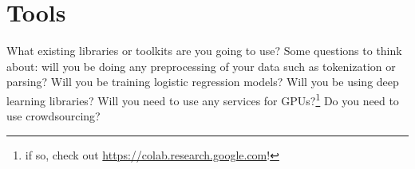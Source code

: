 \documentclass[11pt,a4paper]{article}
\begin{document}
\section{Tools}
What existing libraries or toolkits are you going to use? Some questions to think about: will you be doing any preprocessing of your data such as tokenization or parsing? Will you be training logistic regression models? Will you be using deep learning libraries? Will you need to use any services for GPUs?\footnote{if so, check out \url{https://colab.research.google.com}!} Do you need to use crowdsourcing?


\footnotesize

\end{document}
